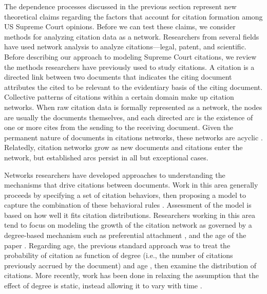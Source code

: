 \documentclass[headsepline=true, abstracton]{scrartcl}
\begin{document}
The dependence processes discussed in the previous section represent new theoretical claims regarding the factors that account for citation formation among US Supreme Court opinions. Before we can test these claims, we consider methods for analyzing citation data as a network. Researchers from several fields have used network analysis to analyze citations---legal, patent, and scientific. Before describing our approach to modeling Supreme Court citations, we review the methods researchers have previously used to study citations. A citation is a directed link between two documents that indicates the citing document attributes the cited to be relevant to the evidentiary basis of the citing document. Collective patterns of citations within a certain domain make up citation networks. When raw citation data is formally represented as a network, the nodes are usually the documents themselves, and each directed arc is the existence of one or more cites from the sending to the receiving document. Given the permanent nature of documents in citations networks, these networks are acyclic \citep{leicht2007large,karrer2009random}. Relatedly, citation networks grow as new documents and citations enter the network, but established arcs persist in all but exceptional cases. 
	
Networks researchers have developed approaches to understanding the mechanisms that drive citations between documents. Work in this area generally proceeds by specifying a set of citation behaviors, then proposing a model to capture the combination of these behavioral rules \citep{simkin2007mathematical}. Assessment of the model is based on how well it fits citation distributions. Researchers working in this area tend to focus on modeling the growth of the citation network as governed by a degree-based mechanism such as preferential attachment \citep{barabasi1999emergence, vazquez2001statistics}, and the age of the paper \citep{jeong2003measuring,eom2011characterizing,wang2013quantifying}. Regarding age, the previous standard approach was to treat the probability of citation as function of degree (i.e., the number of citations previously accrued by the document) and age \citep{hajra2005aging,hajra2006modelling}, then examine the distribution of citations. More recently, work has been done in relaxing the assumption that the effect of degree is static, instead allowing it to vary with time \citep{wang2008measuring}.
	
\end{document}
